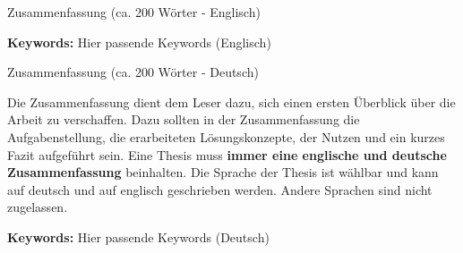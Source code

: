 
Zusammenfassung (ca. 200 Wörter - Englisch)


\textcolor{mireviColorOrange}{\textbf{Keywords:}} Hier passende Keywords (Englisch)


Zusammenfassung (ca. 200 Wörter - Deutsch)


Die Zusammenfassung dient dem Leser dazu, sich einen ersten Überblick über die Arbeit zu verschaffen. Dazu sollten in der Zusammenfassung die Aufgabenstellung, die erarbeiteten Lösungskonzepte, der Nutzen und ein kurzes Fazit aufgeführt sein. Eine Thesis muss \textbf{immer eine englische und deutsche Zusammenfassung} beinhalten. Die Sprache der Thesis ist wählbar und kann auf deutsch und auf englisch geschrieben werden. Andere Sprachen sind nicht zugelassen. 

\textcolor{mireviColorOrange}{\textbf{Keywords:}} Hier passende Keywords (Deutsch)